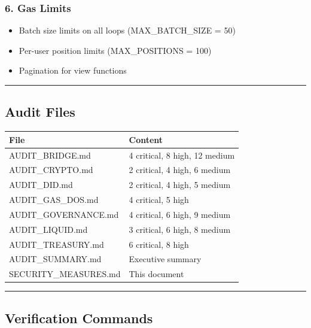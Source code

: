 \documentclass[
]{article}
\newcounter{none} %
\providecommand{\tightlist}{%
  \setlength{\itemsep}{0pt}\setlength{\parskip}{0pt}}
\begin{document}
\subsubsection{6. Gas Limits}\label{6-gas-limits}

\begin{itemize}
\tightlist
\item
  Batch size limits on all loops (MAX\_BATCH\_SIZE = 50)
\item
  Per-user position limits (MAX\_POSITIONS = 100)
\item
  Pagination for view functions
\end{itemize}

\begin{center}\rule{0.5\linewidth}{0.5pt}\end{center}

\subsection{Audit Files}\label{audit-files}

{\def\LTcaptype{none} %
\begin{longtable}[]{@{}ll@{}}
\toprule\noalign{}
File & Content \\
\midrule\noalign{}
\endhead
\bottomrule\noalign{}
\endlastfoot
AUDIT\_BRIDGE.md & 4 critical, 8 high, 12 medium \\
AUDIT\_CRYPTO.md & 2 critical, 4 high, 6 medium \\
AUDIT\_DID.md & 2 critical, 4 high, 5 medium \\
AUDIT\_GAS\_DOS.md & 4 critical, 5 high \\
AUDIT\_GOVERNANCE.md & 4 critical, 6 high, 9 medium \\
AUDIT\_LIQUID.md & 3 critical, 6 high, 8 medium \\
AUDIT\_TREASURY.md & 6 critical, 8 high \\
AUDIT\_SUMMARY.md & Executive summary \\
SECURITY\_MEASURES.md & This document \\
\end{longtable}
}

\begin{center}\rule{0.5\linewidth}{0.5pt}\end{center}

\subsection{Verification Commands}\label{verification-commands}
\end{document}
